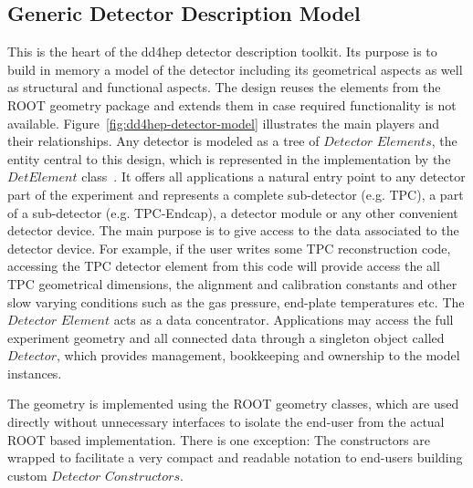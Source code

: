 \subsection{Generic Detector Description Model}
\label{subsec:generic-model}

\noindent
This is the heart of the dd4hep detector description toolkit. Its purpose is 
to build in memory a model of the detector including its geometrical aspects
as well as structural and functional aspects. The design reuses the elements 
from the ROOT geometry package and extends them in case required functionality 
is not available. Figure~\ref{fig:dd4hep-detector-model} illustrates the main
players and their relationships.
Any detector is modeled as a tree of $Detector$ $Elements$, the entity 
central to this design, which is represented in the implementation by 
the $DetElement$ class~\cite{bib:LHCb-geometry}. It offers all
applications a natural entry point to any detector part of the experiment
and represents a complete sub-detector (e.g. TPC), a part of a 
sub-detector (e.g. TPC-Endcap), a detector module or any other convenient 
detector device. 
The main purpose is to give access to the data associated 
to the detector device. For example, if the user writes some TPC reconstruction 
code, accessing the TPC detector element from this code will provide access 
the all TPC geometrical dimensions, the alignment and calibration constants 
and other slow varying conditions such as the gas pressure, end-plate 
temperatures etc. The $Detector$ $Element$ acts as a data concentrator. 
Applications may access the full experiment geometry and all connected data
through a singleton object called $Detector$, which provides 
management, bookkeeping and ownership to the model instances.

\noindent
The geometry is implemented using the ROOT geometry classes, which are used
directly without unnecessary interfaces to isolate the end-user from the 
actual ROOT based implementation. There is one exception: 
The constructors are wrapped to facilitate a very compact and readable 
notation to end-users building custom $Detector$ $Constructors$.

